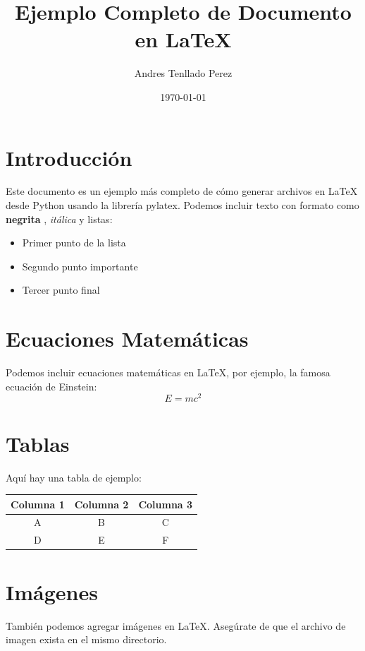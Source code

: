 \documentclass{article}%
\title{Ejemplo Completo de Documento en LaTeX}%
\author{Andres Tenllado Perez}%
\date{\today}%
\begin{document}
%
\normalsize%
\maketitle%
\section{Introducción}%
\label{sec:Introduccin}%
Este documento es un ejemplo más completo de cómo generar archivos en LaTeX desde Python usando la librería pylatex.\newline%
%
Podemos incluir texto con formato como %
\textbf{negrita}%
, %
\textit{itálica}%
 y listas:\newline%
%
\begin{itemize}%
\item Primer punto de la lista%
\item Segundo punto importante%
\item Tercer punto final%
\end{itemize}

%
\section{Ecuaciones Matemáticas}%
\label{sec:EcuacionesMatemticas}%
Podemos incluir ecuaciones matemáticas en LaTeX, por ejemplo, la famosa ecuación de Einstein:%
\begin{equation} E = mc^2 \end{equation}

%
\section{Tablas}%
\label{sec:Tablas}%
Aquí hay una tabla de ejemplo:\newline%
%
\begin{tabular}{c c c}%
\hline%
Columna 1&Columna 2&Columna 3\\%
\hline%
A&B&C\\%
D&E&F\\%
\hline%
\end{tabular}

%
\section{Imágenes}%
\label{sec:Imgenes}%
También podemos agregar imágenes en LaTeX. Asegúrate de que el archivo de imagen exista en el mismo directorio.\newline%
%
\end{document}

